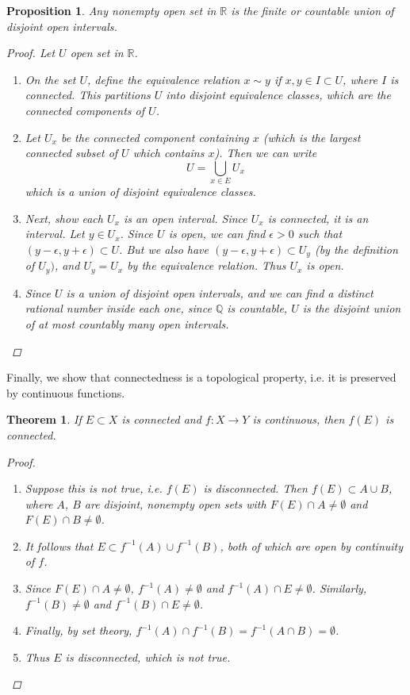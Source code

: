 \documentclass[10pt]{article}         %
\newtheorem{theorem}{Theorem}[section]
\newtheorem{proposition}{Proposition}[section]
\theoremstyle{remark}
\newcommand{\R}{\mathbb{R}}
\newcommand{\Q}{\mathbb{Q}}
\begin{document}
\begin{proposition}
Any nonempty open set in $\R$ is the finite or countable union of disjoint open intervals.
\begin{proof}
Let $U$ open set in $\R$.
\begin{enumerate}
\item On the set $U$, define the equivalence relation $x \sim y$ if $x, y \in I \subset U$, where $I$ is connected. This partitions $U$ into disjoint equivalence classes, which are the connected components of $U$.
\item Let $U_x$ be the connected component containing $x$ (which is the largest connected subset of $U$ which contains $x$). Then we can write
\[
U = \bigcup_{x \in E}U_x
\]
which is a union of disjoint equivalence classes.
\item Next, show each $U_x$ is an open interval. Since $U_x$ is connected, it is an interval. Let $y \in U_x$. Since $U$ is open, we can find $\epsilon > 0$ such that $(y-\epsilon, y+\epsilon) \subset U$. But we also have $(y-\epsilon, y+\epsilon) \subset U_y$ (by the definition of $U_y)$, and $U_y = U_x$ by the equivalence relation. Thus $U_x$ is open.
\item Since $U$ is a union of disjoint open intervals, and we can find a distinct rational number inside each one, since $\Q$ is countable, $U$ is the disjoint union of at most countably many open intervals.
\end{enumerate}
\end{proof}
\end{proposition}

Finally, we show that connectedness is a topological property, i.e. it is preserved by continuous functions.

\begin{theorem}
If $E \subset X$ is connected and $f:X\rightarrow Y$ is continuous, then $f(E)$ is connected.
\begin{proof}
\begin{enumerate}
    \item Suppose this is not true, i.e. $f(E)$ is disconnected. Then $f(E) \subset A \cup B$, where $A$, $B$ are disjoint, nonempty open sets with $F(E) \cap A \neq \emptyset$ and $F(E) \cap B \neq \emptyset$. 
    \item It follows that $E \subset f^{-1}(A) \cup f^{-1}(B)$, both of which are open by continuity of $f$.
    \item Since $F(E) \cap A \neq \emptyset$, $f^{-1}(A) \neq \emptyset$ and $f^{-1}(A) \cap E \neq \emptyset$. Similarly, $f^{-1}(B) \neq \emptyset$ and $f^{-1}(B) \cap E \neq \emptyset$.
    \item Finally, by set theory, $f^{-1}(A) \cap f^{-1}(B) = f^{-1}(A \cap B) = \emptyset$.
    \item Thus $E$ is disconnected, which is not true.
\end{enumerate}
\end{proof}
\end{theorem}
\end{document}
